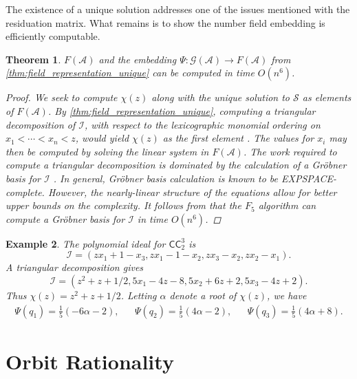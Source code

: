 \documentclass[12pt, letterpaper]{article}
\newcommand{\paren}[1]{\left(#1\right)}
\newcommand{\A}{\mathcal A}
\newcommand{\CC}{\mathsf{CC}}
\newcommand{\I}{\mathcal I}
\renewcommand{\S}{\mathcal S}
\newcommand{\gp}{\mathcal G}
\newtheorem{thm}{Theorem}[section]
\newtheorem{example}[thm]{Example}
\begin{document}
The existence of a unique solution addresses one of the issues mentioned with
the residuation matrix. What remains is to show the number field embedding is
efficiently computable.

\begin{thm}\label{thm:field_representation_efficient}
    $F(\A)$ and the embedding $\Psi : \gp(\A) \rightarrow F(\A)$ from
    \cref{thm:field_representation_unique} can be computed in time $O(n^6)$.
    \begin{proof}
        We seek to compute $\chi(z)$ along with the unique solution to $\S$ as
        elements of $F(\A)$. By \cref{thm:field_representation_unique},
        computing a triangular decomposition of $\I$, with respect to the
        lexicographic monomial ordering on $x_1 < \cdots < x_n < z$, would
        yield $\chi(z)$ as the first element \cite{LAZARD1992117}.  The values
        for $x_i$ may then be computed by solving the linear system in $F(\A)$.
        The work required to compute a triangular decomposition is dominated by
        the calculation of a Gr\"obner basis for $\I$ \cite{LAZARD1992117}.  In
        general, Gr\"obner basis calculation is known to be EXPSPACE-complete.
        However, the nearly-linear structure of the equations allow for better
        upper bounds on the complexity. It follows from
        \cite{faugere2011grobner} that the $F_5$ algorithm can compute a
        Gr\"obner basis for $\I$ in time $O(n^6)$.
    \end{proof}
\end{thm}

\begin{example}\label{example:field-cc-3-2}
    The polynomial ideal for $\CC^3_2$ is
    \[
        \I = (zx_1 + 1 - x_3, zx_1 - 1 - x_2, zx_3 - x_2, z x_2 - x_1).
    \]
    A triangular decomposition gives
    \[
        \I = (z^2 + z + 1/2, 5x_1 - 4z - 8, 5x_2 + 6z + 2, 5x_3 - 4z + 2).
    \]
    Thus $\chi(z) = z^2 + z + 1/2$. Letting $\alpha$ denote a root of
    $\chi(z)$, we have
    \begin{align*}
        \Psi(q_1) = \frac{1}{5}\paren{-6 \alpha - 2},
        &&
        \Psi(q_2) = \frac{1}{5}\paren{4 \alpha - 2},
        &&
        \Psi(q_3) = \frac{1}{5}\paren{4 \alpha + 8}.
    \end{align*}
\end{example}

\section{Orbit Rationality}
\end{document}
